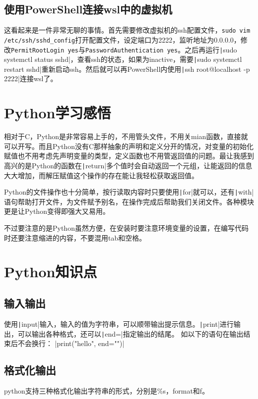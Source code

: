 \documentclass[fontset=ubuntu]{ctexart}
\begin{document}
\subsection{使用PowerShell连接wsl中的虚拟机}
这看起来是一件非常无聊的事情。首先需要修改虚拟机的ssh配置文件，\verb|sudo vim /etc/ssh/sshd_config|打开配置文件，设定端口为2222，监听地址为0.0.0.0，修改\verb|PermitRootLogin yes|与\verb|PasswordAuthentication yes|。之后再运行\texttt|sudo systemctl status sshd|，查看ssh的状态，如果为inactive，需要\texttt|sudo systemctl restart sshd|重新启动ssh。然后就可以再PowerShell内使用\texttt|ssh root@localhost -p 2222|连接wsl了。

\section{Python学习感悟}
相对于C，Python是非常容易上手的，不用管头文件，不用关mian函数，直接就可以开写。而且Python没有C那样抽象的声明和定义分开的情况，对变量的初始化赋值也不用考虑先声明变量的类型，定义函数也不用管返回值的问题。最让我感到高兴的是Python的函数在\texttt|return|多个值时会自动返回一个元组，让能返回的信息大大增加，而解压赋值这个操作的存在能让我轻松获取返回值。

Python的文件操作也十分简单，按行读取内容时只要使用\texttt|for|就可以，还有\texttt|with|语句帮助打开文件，为文件赋予别名，在操作完成后帮助我们关闭文件。各种模块更是让Python变得即强大又易用。

不过要注意的是Python虽然方便，在安装时要注意环境变量的设置，在编写代码时还要注意缩进的内容，不要混用tab和空格。

\section{Python知识点}
\subsection{输入输出}
使用\texttt|input|输入，输入的值为字符串，可以顺带输出提示信息。\texttt|print|进行输出，可以输出各种格式，还可以\texttt|end=|指定输出的结尾。
如以下的语句在输出结束后不会换行：
|print("hello", end="")|

\subsection{格式化输出}
python支持三种格式化输出字符串的形式，分别是\%s，format和f。
\end{document}
